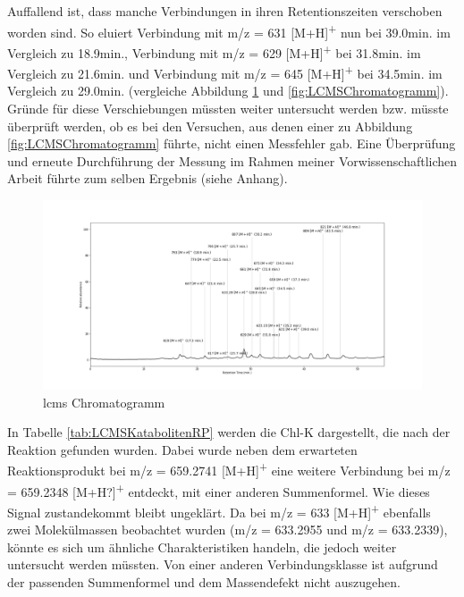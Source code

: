 Auffallend ist, dass manche Verbindungen in ihren Retentionszeiten verschoben worden sind. So eluiert Verbindung mit m/z = 631 [M+H]\textsuperscript{+} nun bei 39.0min. im Vergleich zu 18.9min., Verbindung mit m/z = 629 [M+H]\textsuperscript{+} bei 31.8min. im Vergleich zu 21.6min. und Verbindung mit m/z = 645 [M+H]\textsuperscript{+} bei 34.5min. im Vergleich zu 29.0min. (vergleiche Abbildung \ref{fig:LCMSCChromatogrammRP} und \ref{fig:LCMSChromatogramm}). Gründe für diese Verschiebungen müssten weiter untersucht werden bzw. müsste überprüft werden, ob es bei den Versuchen, aus denen einer zu Abbildung \ref{fig:LCMSChromatogramm} führte, nicht einen Messfehler gab. Eine Überprüfung und erneute Durchführung der Messung im Rahmen meiner Vorwissenschaftlichen Arbeit führte zum selben Ergebnis (siehe Anhang). 

\begin{figure}[!htbp]
  \centering
  \includegraphics[width=1\textwidth]{figures/Kapitel6/Reaktion3h/Kuerbis_Analyse_Reaktion3h_Ganzes_Spektrum.png}
  \caption[LC-MS Chromatogramm nach 3h Reaktionsdauer, Quelle: Autor]{\gls{lcms} Chromatogramm}
  \label{fig:LCMSCChromatogrammRP}
\end{figure}

In Tabelle \ref{tab:LCMSKatabolitenRP} werden die \gls{Chl-K} dargestellt, die nach der Reaktion gefunden wurden. Dabei wurde neben dem erwarteten Reaktionsprodukt bei m/z = 659.2741 [M+H]\textsuperscript{+} eine weitere Verbindung bei m/z = 659.2348 [M+H?]\textsuperscript{+} entdeckt, mit einer anderen Summenformel. Wie dieses Signal zustandekommt  bleibt ungeklärt. Da bei m/z = 633 [M+H]\textsuperscript{+} ebenfalls zwei Molekülmassen beobachtet wurden (m/z = 633.2955 und m/z = 633.2339), könnte es sich um ähnliche Charakteristiken handeln, die jedoch weiter untersucht werden müssten. Von einer anderen Verbindungsklasse ist aufgrund der passenden Summenformel und dem Massendefekt nicht auszugehen. \\


